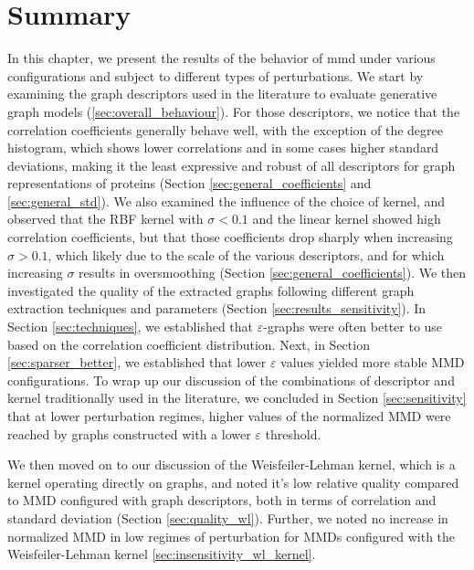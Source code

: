 \clearpage

\section{Summary}

In this chapter, we present the results of the behavior of \acrshort{mmd} under
various configurations and subject to different types of perturbations. We start
by examining the graph descriptors used in the literature to evaluate generative
graph models (\ref{sec:overall_behaviour}). For those descriptors, we notice
that the correlation coefficients generally behave well, with the exception of
the degree histogram, which shows lower correlations and in some cases higher
standard deviations, making it the least expressive and robust of all
descriptors for graph representations of proteins (Section
\ref{sec:general_coefficients} and \ref{sec:general_std}). We also examined the
influence of the choice of kernel, and observed that the RBF kernel with
$\sigma<0.1$ and the linear kernel showed high correlation coefficients, but
that those coefficients drop sharply when increasing $\sigma>0.1$, which likely
due to the scale of the various descriptors, and for which increasing $\sigma$
results in oversmoothing (Section \ref{sec:general_coefficients}). We then
investigated the quality of the extracted graphs following different graph
extraction techniques and parameters (Section \ref{sec:results_sensitivity}). In
Section \ref{sec:techniques}, we established that $\varepsilon$-graphs were
often better to use based on the correlation coefficient distribution. Next, in
Section \ref{sec:sparser_better}, we established that lower $\varepsilon$ values
yielded more stable MMD configurations. To wrap up our
discussion of the combinations of descriptor and kernel traditionally used in
the literature, we concluded in Section \ref{sec:sensitivity} that at lower
perturbation regimes, higher values of the normalized MMD were reached by graphs
constructed with a lower $\varepsilon$ threshold.

We then moved on to our discussion of the Weisfeiler-Lehman kernel, which is a
kernel operating directly on graphs, and noted it's low relative quality
compared to MMD configured with graph descriptors, both in terms of correlation
and standard deviation (Section \ref{sec:quality_wl}). Further, we noted no
increase in normalized MMD in low regimes of perturbation for MMDs configured
with the Weisfeiler-Lehman kernel \ref{sec:insensitivity_wl_kernel}.


